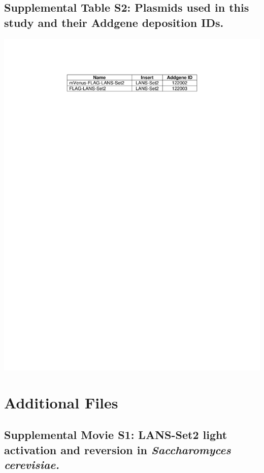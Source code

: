 \documentclass[11pt]{biorxiv}
\begin{document}
\subsection{Supplemental Table S2: Plasmids used in this study and their Addgene deposition IDs.}
\begin{table}[ht!]
\center
\includegraphics[width=\textwidth, trim={0in 9in 0in 1in}, clip]{tables/Supplemental_Table2.pdf}
\end{table}
 
\clearpage

\section{Additional Files}

\subsection{Supplemental Movie S1: LANS-Set2 light activation and reversion in \emph{Saccharomyces cerevisiae.}}
\end{document}
